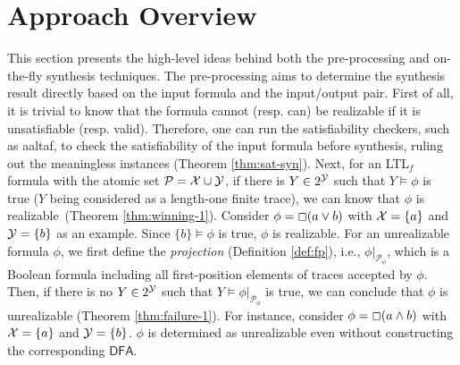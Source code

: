 \documentclass[letterpaper]{article} %
\newcommand{\ltlf}{\textsf{LTL}$_f$\xspace}
\def\dfa{$\mathsf{DFA}$\xspace}
\newcommand{\aaltaf}{{\sf aaltaf}\xspace}
\begin{document}
\section{Approach Overview}
This section presents the high-level ideas behind both the pre-processing and on-the-fly synthesis techniques. The pre-processing aims to determine the synthesis result directly based on the input formula and the input/output pair. First of all, it is trivial to know that the formula cannot (resp. can) be realizable if it is unsatisfiable (resp. valid). Therefore, one can run the satisfiability checkers, such as \aaltaf\citep{LRPZV19}, to check the satisfiability of the input formula before synthesis, ruling out the meaningless instances (Theorem \ref{thm:sat-syn}). Next, for an \ltlf formula with the atomic set $\mathcal{P} = \mathcal{X}\cup\mathcal{Y}$, if there is $Y\in 2^{\mathcal{Y}}$ such that $Y\models\phi$ is true ($Y$ being considered as a length-one finite trace), we can know that $\phi$ is realizable~(Theorem \ref{thm:winning-1}). Consider $\phi = \Box (a\vee b)$ with $\mathcal{X}=\{a\}$ and $\mathcal{Y}=\{b\}$ as an example. Since $\{b\}\models\phi$ is true, $\phi$ is realizable. 
For an unrealizable formula $\phi$, we first define the \emph{projection} (Definition \ref{def:fp}), i.e., $\phi|_{\mathcal{P}_{\phi}}$, which is a Boolean formula including all first-position elements of traces accepted by $\phi$. Then, if there is no $Y\in 2^{\mathcal{Y}}$ such that $Y\models\phi|_{\mathcal{P}_{\phi}}$ is true, we can conclude that $\phi$ is unrealizable (Theorem \ref{thm:failure-1}). For instance, consider $\phi = \Box (a\wedge b)$ with $\mathcal{X}=\{a\}$ and $\mathcal{Y}=\{b\}$. $\phi$ is determined as unrealizable even without constructing the corresponding \dfa. 

\end{document}
